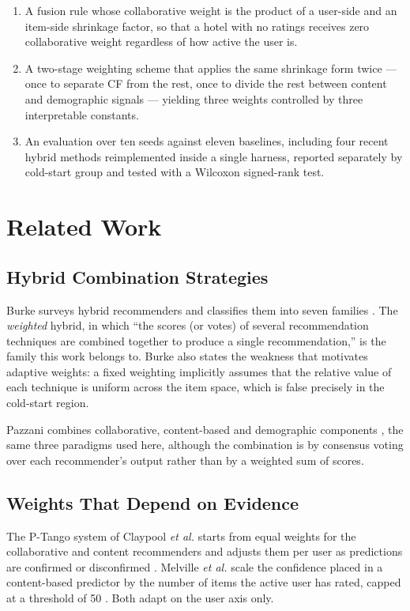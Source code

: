 \documentclass[conference]{IEEEtran}
\begin{document}
\begin{enumerate}
\item A fusion rule whose collaborative weight is the product of a
user-side and an item-side shrinkage factor, so that a hotel with no
ratings receives zero collaborative weight regardless of how active
the user is.
\item A two-stage weighting scheme that applies the same shrinkage
form twice --- once to separate CF from the rest, once to divide the
rest between content and demographic signals --- yielding three
weights controlled by three interpretable constants.
\item An evaluation over ten seeds against eleven baselines,
including four recent hybrid methods reimplemented inside a single
harness, reported separately by cold-start group and tested with a
Wilcoxon signed-rank test.
\end{enumerate}

\section{Related Work}

\subsection{Hybrid Combination Strategies}

Burke surveys hybrid recommenders and classifies them into seven
families \cite{burke2002}. The \emph{weighted} hybrid, in which
``the scores (or votes) of several recommendation techniques are
combined together to produce a single recommendation,'' is the family
this work belongs to. Burke also states the weakness that motivates
adaptive weights: a fixed weighting implicitly assumes that the
relative value of each technique is uniform across the item space,
which is false precisely in the cold-start region.

Pazzani combines collaborative, content-based and demographic
components \cite{pazzani1999}, the same three paradigms used here,
although the combination is by consensus voting over each
recommender's output rather than by a weighted sum of scores.

\subsection{Weights That Depend on Evidence}

The P-Tango system of Claypool \textit{et al.} starts from equal
weights for the collaborative and content recommenders and adjusts
them per user as predictions are confirmed or disconfirmed
\cite{claypool1999}. Melville \textit{et al.} scale the confidence
placed in a content-based predictor by the number of items the
active user has rated, capped at a threshold of 50
\cite{melville2002}. Both adapt on the user axis only.
\end{document}
